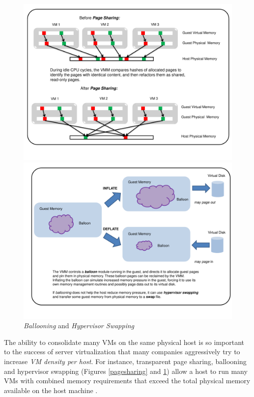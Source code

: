 \begin{figure}[p]
  \centering
  \includegraphics[scale=0.55, trim=1cm 0cm 2cm 0cm]{pagesharing.pdf}  
  \caption[{\em Transparent Page Sharing}]%
          {{\em Transparent Page Sharing}}
          \label{pagesharing}
  \includegraphics[scale=0.58, trim=1cm 0cm 1cm 0cm]{balloon.pdf}   
  \caption[{\em Ballooning} and {\em Hypervisor Swapping}]%
          {{\em Ballooning} and {\em Hypervisor Swapping}}
          \label{balloon}
\end{figure}


The ability to consolidate many VMs
on the same physical host is so important to the success
of server virtualization that many companies 
aggressively try to increase {\em VM density per host}.
For instance, transparent page sharing, ballooning
and hypervisor swapping (Figures \ref{pagesharing} and \ref{balloon})
allow a host to run many VMs with
combined memory requirements
that exceed the total physical memory
available on the host machine \cite{waldspurger2002memory}.

